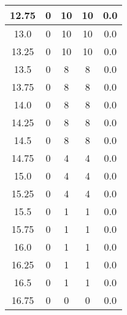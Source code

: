 \documentclass[letterpaper, 12pt]{article}
\begin{document}
\begin{longtable}{|c|c|c|c|c|}
\hline
12.75 & 0 & 10 & 10 & 0.0 \\
\hline
13.0 & 0 & 10 & 10 & 0.0 \\
\hline
13.25 & 0 & 10 & 10 & 0.0 \\
\hline
13.5 & 0 & 8 & 8 & 0.0 \\
\hline
13.75 & 0 & 8 & 8 & 0.0 \\
\hline
14.0 & 0 & 8 & 8 & 0.0 \\
\hline
14.25 & 0 & 8 & 8 & 0.0 \\
\hline
14.5 & 0 & 8 & 8 & 0.0 \\
\hline
14.75 & 0 & 4 & 4 & 0.0 \\
\hline
15.0 & 0 & 4 & 4 & 0.0 \\
\hline
15.25 & 0 & 4 & 4 & 0.0 \\
\hline
15.5 & 0 & 1 & 1 & 0.0 \\
\hline
15.75 & 0 & 1 & 1 & 0.0 \\
\hline
16.0 & 0 & 1 & 1 & 0.0 \\
\hline
16.25 & 0 & 1 & 1 & 0.0 \\
\hline
16.5 & 0 & 1 & 1 & 0.0 \\
\hline
16.75 & 0 & 0 & 0 & 0.0 \\
\hline
\end{longtable}
\end{document}
